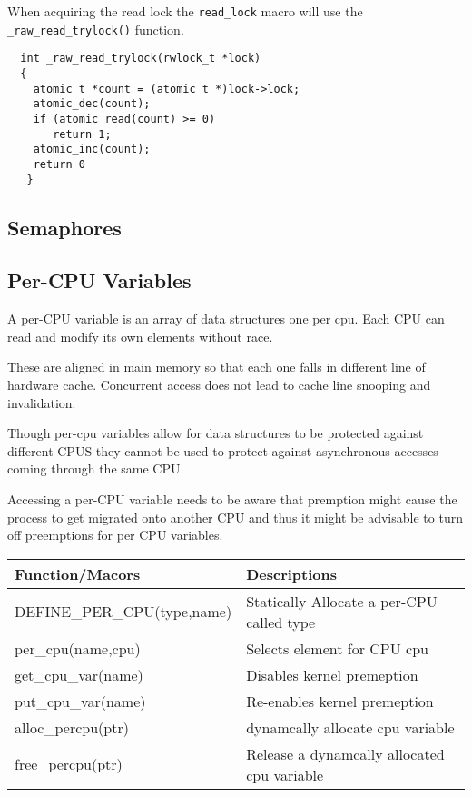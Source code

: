 \documentclass{article}
\begin{document}
When acquiring the read lock the \lstinline{read_lock} macro will use
the \lstinline{_raw_read_trylock()} function.

\begin{lstlisting}
  int _raw_read_trylock(rwlock_t *lock)
  {
    atomic_t *count = (atomic_t *)lock->lock;
    atomic_dec(count);
    if (atomic_read(count) >= 0)
       return 1;
    atomic_inc(count);
    return 0
   }
\end{lstlisting}



\subsection{Semaphores}



\subsection{Per-CPU Variables}

A per-CPU variable is an array of data structures one per cpu. Each CPU
can read and modify its own elements without race.

These are aligned in main memory so that each one falls in different
line of hardware cache. Concurrent access does not lead to cache line
snooping and invalidation.

Though per-cpu variables allow for data structures to be protected
against different CPUS they cannot be used to protect against
asynchronous accesses coming through the same CPU.

Accessing a per-CPU variable needs to be aware that premption might
cause the process to get migrated onto another CPU and thus it might
be advisable to turn off preemptions for per CPU variables.


\begin{center}
  \begin{tabular}{ l | l }
    
    \hline
    Function/Macors & Descriptions \\ \hline
    DEFINE\_PER\_CPU(type,name) & Statically Allocate a per-CPU called type \\ 
    per\_cpu(name,cpu) & Selects element for CPU cpu \\ 
    get\_cpu\_var(name) &  Disables kernel premeption \\
    put\_cpu\_var(name) &  Re-enables kernel premeption \\
    alloc\_percpu(ptr) &  dynamcally allocate cpu variable \\
    free\_percpu(ptr) &  Release a dynamcally allocated cpu variable \\
    \hline
  \end{tabular}
\end{center}
\end{document}
